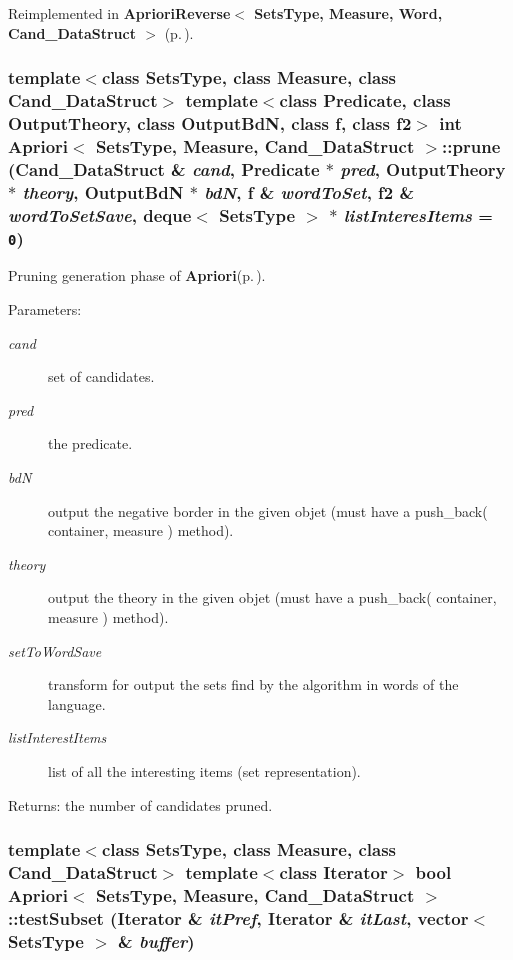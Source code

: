 Reimplemented in {\bf Apriori\-Reverse$<$ Sets\-Type, Measure, Word, Cand\_\-Data\-Struct $>$} {\rm (p.\,\pageref{class_apriori_reverse_f82618122967f0c6da9c4de5ea60a367})}.
\subsubsection{\setlength{\rightskip}{0pt plus 5cm}template$<$class Sets\-Type, class Measure, class Cand\_\-Data\-Struct$>$ template$<$class Predicate, class Output\-Theory, class Output\-Bd\-N, class f, class f2$>$ int {\bf Apriori}$<$ Sets\-Type, Measure, Cand\_\-Data\-Struct $>$::prune (Cand\_\-Data\-Struct \& {\em cand}, {\bf Predicate} $\ast$ {\em pred}, Output\-Theory $\ast$ {\em theory}, Output\-Bd\-N $\ast$ {\em bd\-N}, f \& {\em word\-To\-Set}, f2 \& {\em word\-To\-Set\-Save}, deque$<$ Sets\-Type $>$ $\ast$ {\em list\-Interes\-Items} = {\tt 0})\hspace{0.3cm}{\tt  [protected]}}\label{class_apriori_a9bea497daba465a98b5ff9e933c2b27}


Pruning generation phase of {\bf Apriori}{\rm (p.\,\pageref{class_apriori})}. 

\begin{Desc}
\item[Parameters:]
\begin{description}
\item[{\em cand}]set of candidates. \item[{\em pred}]the predicate. \item[{\em bd\-N}]output the negative border in the given objet (must have a push\_\-back( container, measure ) method). \item[{\em theory}]output the theory in the given objet (must have a push\_\-back( container, measure ) method). \item[{\em set\-To\-Word\-Save}]transform for output the sets find by the algorithm in words of the language. \item[{\em list\-Interest\-Items}]list of all the interesting items (set representation). \end{description}
\end{Desc}
\begin{Desc}
\item[Returns:]the number of candidates pruned. \end{Desc}
\subsubsection{\setlength{\rightskip}{0pt plus 5cm}template$<$class Sets\-Type, class Measure, class Cand\_\-Data\-Struct$>$ template$<$class Iterator$>$ bool {\bf Apriori}$<$ Sets\-Type, Measure, Cand\_\-Data\-Struct $>$::test\-Subset (Iterator \& {\em it\-Pref}, Iterator \& {\em it\-Last}, vector$<$ Sets\-Type $>$ \& {\em buffer})\hspace{0.3cm}{\tt  [protected]}}\label{class_apriori_c86b934cfaf6e553ff92e8930eadf4b7}


